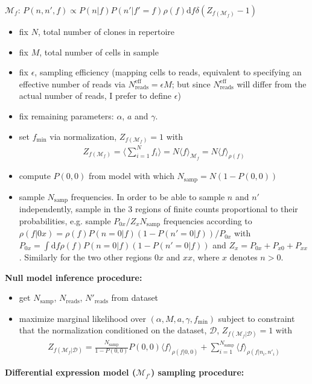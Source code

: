 \documentclass[letterpaper,english,prl,reprint,onecolumn,longbibliography]{revtex4-1} %
\begin{document}
$\mathcal{M}_f$: $P(n,n',f)\propto P(n|f)P(n'|f'=f)\rho(f)\textrm{d}f\delta(Z_{f(\mathcal{M}_f)}-1)$
\begin{itemize}
	\item  fix $N$, total number of clones in repertoire
	\item  fix $M$, total number of cells in sample
	\item  fix $\epsilon$, sampling efficiency (mapping cells to reads, equivalent to specifying an effective number of reads via $N^{\textrm{eff}}_{\textrm{reads}}=\epsilon M$; but since $N^{\textrm{eff}}_{\textrm{reads}}$ will differ from the actual number of reads, I prefer to define $\epsilon$)
	\item  fix remaining parameters: $\alpha$, $a$ and $\gamma$.
	\item  set $f_\textrm{min}$ via normalization, $Z_{f(\mathcal{M}_f)}=1$ with
	\begin{align}
		Z_{f(\mathcal{M}_f)}=\langle \sum_{i=1}^N f_i \rangle=N\langle f \rangle_{\mathcal{M}_{f}}=N\langle f \rangle_{\rho(f)}
	\end{align}
	\item  compute $P(0,0)$ from model with which $N_\textrm{samp}=N(1-P(0,0))$ 
	\item  sample $N_\textrm{samp}$ frequencies. In order to be able to sample $n$ and $n'$ independently, sample in the 3 regions of finite counts proportional to their probabilities, e.g. sample $P_{0x}/Z_x N_\textrm{samp}$ frequencies according to $\rho(f|0x)=\rho(f)P(n=0|f)(1-P(n'=0|f))/P_{0x}$ with $P_{0x}=\int \textrm{d}f\rho(f)P(n=0|f)(1-P(n'=0|f))$ and $Z_x=P_{0x}+P_{x0}+P_{xx}$. Similarly for the two other regions $0x$ and $xx$, where $x$ denotes $n>0$.
\end{itemize}
\textbf{Null model inference procedure:}
\begin{itemize}
	\item  get $N_\textrm{samp}$, $N_{\textrm{reads}}$, $N'_{\textrm{reads}}$ from dataset
	\item  maximize marginal likelihood over $(\alpha,M,a,\gamma,f_\textrm{min})$ subject to constraint that the normalization conditioned on the dataset, $\mathcal{D}$, $Z_{f(\mathcal{M}_f|\mathcal{D})}=1$ with
	\begin{align}
		Z_{f(\mathcal{M}_f|\mathcal{D})}=\frac{N_{\textrm{samp}}}{1-P(0,0)} P(0,0)\langle f\rangle_{\rho(f|0,0)}+\sum_{i=1}^{N_{\textrm{samp}}}\langle f\rangle_{\rho(f|n_i,n'_i)}
	\end{align}
\end{itemize}
\textbf{Differential expression model ($\mathcal{M}_{f'}$) sampling procedure:}
\end{document}

